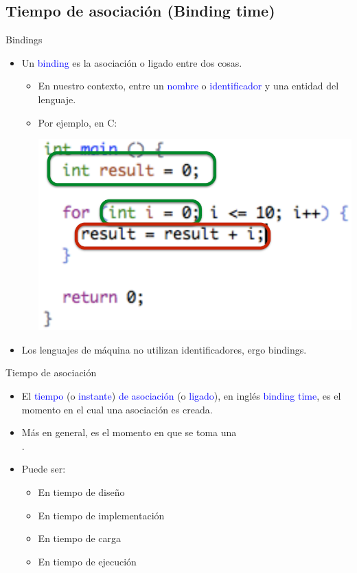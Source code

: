 \documentclass{beamer} %
\newcommand{\blue}[1]{\textcolor{blue}{#1}}
\newcommand{\redb}[1]{{\color{red!70!black}{#1}}}
\begin{document}
\subsection{Tiempo de asociación (Binding time)}

\begin{frame}{Bindings}
    \begin{itemize}
        \item<1-> Un \blue{binding} es la asociación o ligado entre dos cosas.
        \begin{itemize}
            \item En nuestro contexto, entre un \blue{nombre} o \blue{identificador} y una entidad del lenguaje.
            \item<2-> Por ejemplo, en C:
            \medskip
            
            \begin{center}
                \includegraphics[width=.6\textwidth]{./image/cap5/bindings-C}
            \end{center}
        \end{itemize}
        \item<3-> Los lenguajes de máquina no utilizan identificadores, ergo bindings.
    \end{itemize}
\end{frame}

\begin{frame}{Tiempo de asociación}
    \begin{itemize}
        \item<1-> El \blue{tiempo} (o \blue{instante}) \blue{de asociación} (o \blue{ligado}), en inglés \blue{binding time}, es el momento en el cual una asociación es creada.
        \item<2-> Más en general, es el momento en que se toma una\\ \redb{decisión sobre implementación}.
        \item<3-> Puede ser:
        \begin{itemize}
            \item En tiempo de diseño
            \item En tiempo de implementación
            \item En tiempo de carga
            \item En tiempo de ejecución
        \end{itemize}
    \end{itemize}
\end{frame}
\end{document}
